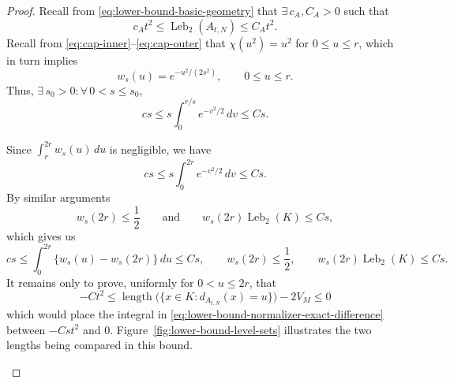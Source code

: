 \documentclass{article}
\newcommand{\Leb}{\operatorname{Leb}}
\numberwithin{equation}{section}
\begin{document}
\begin{proof}
Recall from \eqref{eq:lower-bound-basic-geometry} that $\exists \,c_A,C_A>0$ such that
\[
 c_At^2\le\Leb_2(A_{t,N})\le C_At^2.
\]
Recall from \eqref{eq:cap-inner}--\eqref{eq:cap-outer} that $\chi(u^2)=u^2$ for $0\leq u\leq r$, which in turn implies
\[
 w_s(u)=e^{-u^2/(2s^2)},
 \qquad 0\le u\le r.
\]
Thus, $\exists\, s_0>0 : \forall\,0<s\le s_0$,
\[
 cs\leq s\int_0^{r/s}e^{-v^2/2}\,dv\leq Cs.
\]

Since
$ \int_r^{2r} w_s(u)\,du$
is negligible, we have
\[
 cs\leq s\int_0^{2r}e^{-v^2/2}\,dv\leq Cs.
\]
By similar arguments
\[
 w_s(2r)\le\frac12
 \qquad\text{and}\qquad
 w_s(2r)\Leb_2(K)\le Cs,
\]
which gives us
\begin{equation}
 c s\le\int_0^{2r}\{w_s(u)-w_s(2r)\}\,du\le Cs,
 \qquad
 w_s(2r)\le\frac12,
 \qquad
 w_s(2r)\Leb_2(K)\le Cs.
\label{eq:lower-bound-weight-integral}
\end{equation}
 It remains only to prove, uniformly for $0<u\le2r$, that
\begin{equation}
 -Ct^2\le
 \operatorname{length}
 \bigl(\{x\in K:d_{A_{t,N}}(x)=u\}\bigr)-2V_M
 \le0
\label{eq:lower-bound-length-task}
\end{equation}
which would place the integral in
\eqref{eq:lower-bound-normalizer-exact-difference} between $-Cst^2$ and
$0$. Figure~\ref{fig:lower-bound-level-sets} illustrates the two lengths
being compared in this bound.

\begingroup
\renewcommand{\theHfigure}{lowerboundlevels.\arabic{figure}}
\label{fig:lower-bound-level-sets}
\begin{center}
\end{center}
\end{proof}
\end{document}

